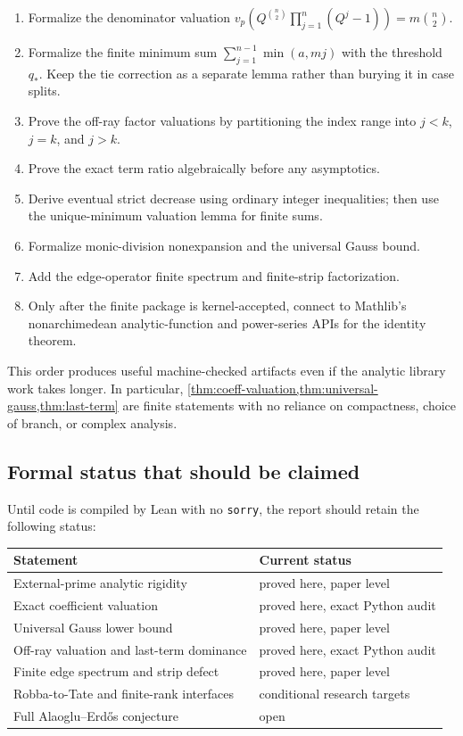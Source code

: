 \documentclass[11pt,oneside]{article}
\theoremstyle{definition}
\newcommand{\vp}{v_p}
\newcommand{\AEconj}{Alaoglu--Erd\H{o}s}
\begin{document}
\begin{enumerate}
\item Formalize the denominator valuation
$\vp(Q^{\binom n2}\prod_{j=1}^n(Q^j-1))=m\binom n2$.
\item Formalize the finite minimum sum
$\sum_{j=1}^{n-1}\min(a,mj)$ with the threshold $q_*$.  Keep the tie correction as a
separate lemma rather than burying it in case splits.
\item Prove the off-ray factor valuations by partitioning the index range into
$j<k$, $j=k$, and $j>k$.
\item Prove the exact term ratio algebraically before any asymptotics.
\item Derive eventual strict decrease using ordinary integer inequalities; then use the
unique-minimum valuation lemma for finite sums.
\item Formalize monic-division nonexpansion and the universal Gauss bound.
\item Add the edge-operator finite spectrum and finite-strip factorization.
\item Only after the finite package is kernel-accepted, connect to Mathlib's
nonarchimedean analytic-function and power-series APIs for the identity theorem.
\end{enumerate}

This order produces useful machine-checked artifacts even if the analytic library work takes
longer.  In particular, \cref{thm:coeff-valuation,thm:universal-gauss,thm:last-term} are finite
statements with no reliance on compactness, choice of branch, or complex analysis.

\subsection{Formal status that should be claimed}

Until code is compiled by Lean with no \texttt{sorry}, the report should retain the following
status:
\begin{center}
\begin{tabular}{@{}ll@{}}
\toprule
Statement & Current status\\
\midrule
External-prime analytic rigidity & proved here, paper level\\
Exact coefficient valuation & proved here, exact Python audit\\
Universal Gauss lower bound & proved here, paper level\\
Off-ray valuation and last-term dominance & proved here, exact Python audit\\
Finite edge spectrum and strip defect & proved here, paper level\\
Robba-to-Tate and finite-rank interfaces & conditional research targets\\
Full \AEconj{} conjecture & open\\
\bottomrule
\end{tabular}
\end{center}
\end{document}
